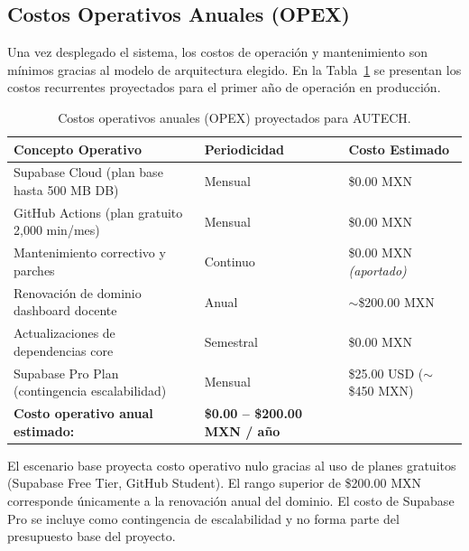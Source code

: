 \subsection{Costos Operativos Anuales (OPEX)}
\label{subsec:costos_operativos}

Una vez desplegado el sistema, los costos de operación y mantenimiento son mínimos gracias al modelo de arquitectura elegido. En la Tabla~\ref{tab:costos_opex} se presentan los costos recurrentes proyectados para el primer año de operación en producción.

\begin{table}[htbp]
\centering
\caption{Costos operativos anuales (OPEX) proyectados para AUTECH.}
\label{tab:costos_opex}
\setlength{\tabcolsep}{4pt}
\renewcommand{\arraystretch}{1.2}
\scriptsize
\begin{tabularx}{\textwidth}{@{} >{\raggedright\arraybackslash}X >{\raggedright\arraybackslash}p{2.4cm} >{\raggedleft\arraybackslash}p{4cm} @{}}
\toprule
\textbf{Concepto Operativo} &
\textbf{Periodicidad} &
\textbf{Costo Estimado} \\
\midrule

Supabase Cloud (plan base hasta 500 MB DB)
  & Mensual    & \$0.00 MXN \\

GitHub Actions (plan gratuito 2{,}000 min/mes)
  & Mensual    & \$0.00 MXN \\

Mantenimiento correctivo y parches
  & Continuo   & \$0.00 MXN \textit{(aportado)} \\

Renovación de dominio dashboard docente
  & Anual      & ${\sim}$\$200.00 MXN \\

Actualizaciones de dependencias core
  & Semestral  & \$0.00 MXN \\

Supabase Pro Plan (contingencia escalabilidad)
  & Mensual    & \$25.00 USD (${\sim}$\$450 MXN) \\

\midrule
\multicolumn{2}{@{} >{\raggedright\arraybackslash}p{9cm}}%
  {\textbf{Costo operativo anual estimado:}} &
  \textbf{\$0.00 -- \$200.00 MXN / año} \\

\bottomrule
\end{tabularx}

\vspace{3pt}
\begin{minipage}{\textwidth}
  \scriptsize
  El escenario base proyecta costo operativo nulo gracias al uso de planes gratuitos
  (Supabase Free Tier, GitHub Student). El rango superior de \$200.00 MXN corresponde
  únicamente a la renovación anual del dominio. El costo de Supabase Pro se incluye
  como contingencia de escalabilidad y no forma parte del presupuesto base del proyecto.
\end{minipage}
\end{table}

